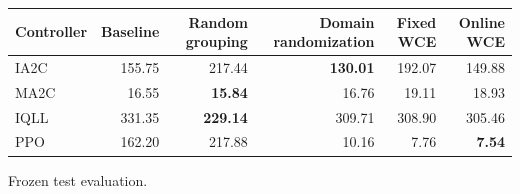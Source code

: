 \begin{tabular}{lrrrrr}
\hline
Controller & Baseline & Random grouping & Domain randomization & Fixed WCE & Online WCE \\
\hline
IA2C & 155.75 & 217.44 & \textbf{130.01} & 192.07 & 149.88 \\
MA2C & 16.55 & \textbf{15.84} & 16.76 & 19.11 & 18.93 \\
IQLL & 331.35 & \textbf{229.14} & 309.71 & 308.90 & 305.46 \\
PPO & 162.20 & 217.88 & 10.16 & 7.76 & \textbf{7.54} \\
\hline
\end{tabular}
Frozen test evaluation.
